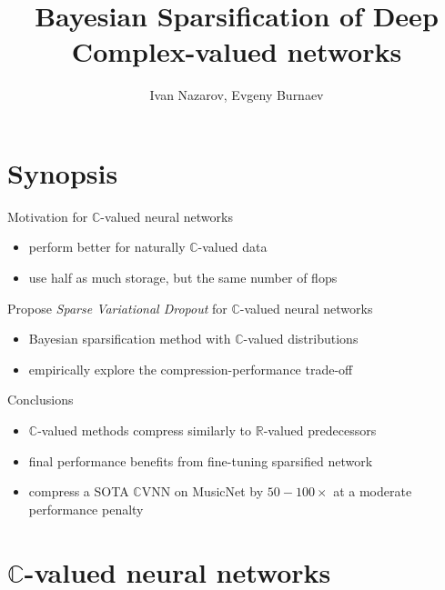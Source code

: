 \documentclass{beamer}
\title[Exam]{Bayesian Sparsification of Deep Complex-valued networks}
\author[Nazarov I., Burnaev E.]{Ivan Nazarov, Evgeny Burnaev}
\date{}
\institute[Skoltech]{ADASE Skoltech \\ Moscow, Russia}
\newcommand{\real}{\mathbb{R}}
\newcommand{\cplx}{\mathbb{C}}
\begin{document}
\begin{frame}
  \titlepage

\end{frame}

\section{Synopsis} %
\label{sec:synopsis}

\begin{frame}[c]{\insertsection}
  Motivation for $\cplx$-valued neural networks
  \begin{itemize}
    \item perform better for naturally $\cplx$-valued data
    \item use half as much storage, but the same number of flops
  \end{itemize}

  \pause
  \medskip
  Propose \emph{Sparse Variational Dropout} for $\cplx$-valued neural networks
  \begin{itemize}
    \item Bayesian sparsification method with $\cplx$-valued distributions 
    \item empirically explore the compression-performance trade-off
  \end{itemize}

  \pause
  \medskip
  Conclusions
  \begin{itemize}
    \item $\cplx$-valued methods compress similarly to $\real$-valued predecessors
    \item final performance benefits from fine-tuning sparsified network
    \item compress a SOTA $\cplx$VNN on MusicNet by $50-100\times$ at a moderate performance penalty
  \end{itemize}

\end{frame}


\section{$\cplx$-valued neural networks} %
\label{sec:complex_valued_networks}
\end{document}

